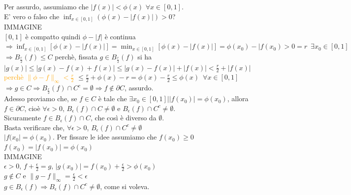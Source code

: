 \documentclass{article}
\begin{document}
\begin{itemize}
    Per assurdo, assumiamo che $|f(x)|<\phi(x)  \,\, \forall x \in [0,1]$.\\
    E' vero o falso che $\inf_{x \in [0,1]}( \phi(x) -|f(x)| )>0$?\\
    IMMAGINE\\
    $[0,1]$ è compatto quindi $\phi - |f|$ è continua $\Rightarrow \inf_{x \in [0,1]} [\phi(x)-|f(x)|]=\min_{x \in [0,1]} [\phi(x)- |f(x)|]= \phi(x_0)-|f(x_0)>0 =r \,\,\, \exists x_0 \in [0,1]$\\
    $\Rightarrow B_{\frac{r}{2}}(f) \leq C$ perchè, fissata $g \in B_{\frac{r}{2}}(f)$ si ha \\
    $|g(x)|\leq |g(x)-f(x)+f(x)|\leq |g(x)-f(x)|+|f(x)|<\frac{r}{2} +|f(x)|$ \textcolor{orange}{perchè $\parallel\phi-f\parallel_\infty < \frac{r}{2}$} $\leq \frac{r}{2}+\phi(x)-r =\phi(x)-\frac{r}{2} \leq \phi(x)\,\,\, \forall x \in [0,1]$\\
    $\Rightarrow g \in C \Rightarrow B_{\frac{r}{2}}(f) \cap C^c=\emptyset\Rightarrow f \notin \partial C$, assurdo.\\
    Adesso proviamo che, se $f\in C$ è tale che $\exists x_0\in [0,1]| |f(x_0)| =\phi(x_0)$, allora $f \in \partial C$, cioè $\forall \epsilon >0$, $B_\epsilon(f) \cap C \neq \emptyset$ e $B_\epsilon(f) \cap C^c \neq \emptyset$.\\
    Sicuramente $f\in B_\epsilon (f) \cap C$, che così è diverso da $\emptyset$.\\
    Basta verificare che, $\forall \epsilon >0$, $B_\epsilon (f) \cap C^c \neq \emptyset$\\
    $|f(x_0|=\phi(x_0)$. Per fissare le idee assumiamo che $f(x_0)\geq 0$\\
    $f(x_0) = |f(x_0)|= \phi(x_0)$\\
    IMMAGINE\\
    $\epsilon >0$, $f+\frac{\epsilon}{2}=g$, $ |g(x_0)|= f(x_0)+\frac{\epsilon}{2}>\phi(x_0)$\\
    $g \notin C$ e $\parallel g-f \parallel_\infty = \frac{\epsilon}{2}<\epsilon$\\
    $g \in B_\epsilon (f) \Rightarrow B_\epsilon (f) \cap C^c \neq \emptyset$, come si voleva.
    
\end{itemize}
\end{document}
